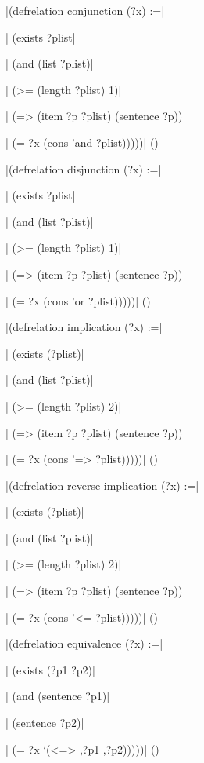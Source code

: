 \medskip
\verbatim|(defrelation conjunction (?x) :=|\par
\verbatim|  (exists ?plist|\par
\verbatim|    (and (list ?plist)|\par
\verbatim|         (>= (length ?plist) 1)|\par
\verbatim|         (=> (item ?p ?plist) (sentence ?p))|\par
\verbatim|         (= ?x (cons 'and ?plist)))))|
\hfill(\equation)\par
\medskip

\medskip
\verbatim|(defrelation disjunction (?x) :=|\par
\verbatim|  (exists ?plist|\par
\verbatim|    (and (list ?plist)|\par
\verbatim|         (>= (length ?plist) 1)|\par
\verbatim|         (=> (item ?p ?plist) (sentence ?p))|\par
\verbatim|         (= ?x (cons 'or ?plist)))))|
\hfill(\equation)\par
\medskip

\medskip
\verbatim|(defrelation implication (?x) :=|\par
\verbatim|  (exists (?plist)|\par
\verbatim|    (and (list ?plist)|\par
\verbatim|         (>= (length ?plist) 2)|\par
\verbatim|         (=> (item ?p ?plist) (sentence ?p))|\par
\verbatim|         (= ?x (cons '=> ?plist)))))|
\hfill(\equation)\par
\medskip

\medskip
\verbatim|(defrelation reverse-implication (?x) :=|\par
\verbatim|  (exists (?plist)|\par
\verbatim|    (and (list ?plist)|\par
\verbatim|         (>= (length ?plist) 2)|\par
\verbatim|         (=> (item ?p ?plist) (sentence ?p))|\par
\verbatim|         (= ?x (cons '<= ?plist)))))|
\hfill(\equation)\par
\medskip

\medskip
\verbatim|(defrelation equivalence (?x) :=|\par
\verbatim|  (exists (?p1 ?p2)|\par
\verbatim|    (and (sentence ?p1)|\par
\verbatim|         (sentence ?p2)|\par
\verbatim|         (= ?x `(<=> ,?p1 ,?p2)))))|
\hfill(\equation)\par
\medskip

